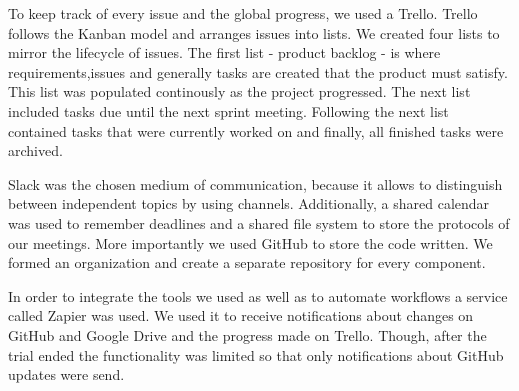 To keep track of every issue and the global progress, we used a Trello.
Trello follows the Kanban model and arranges issues into lists. We
created four lists to mirror the lifecycle of issues. The first list -
product backlog - is where requirements,issues and generally tasks are
created that the product must satisfy. This list was populated
continously as the project progressed. The next list included tasks due
until the next sprint meeting. Following the next list contained tasks
that were currently worked on and finally, all finished tasks were
archived.

Slack was the chosen medium of communication, because it allows to
distinguish between independent topics by using channels. Additionally,
a shared calendar was used to remember deadlines and a shared file
system to store the protocols of our meetings. More importantly we used
GitHub to store the code written. We formed an organization and create a
separate repository for every component.

In order to integrate the tools we used as well as to automate
workflows a service called Zapier was used. We used it to receive
notifications about changes on GitHub and Google Drive and the progress
made on Trello. Though, after the trial ended the functionality was
limited so that only notifications about GitHub updates were send.
